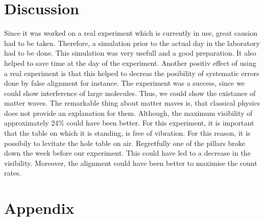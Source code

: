 \documentclass[12pt,a4paper]{article}
\begin{document}
\begin{multicols}{2}

\section{Discussion}
Since it was worked on a real experiment which is currently in use, great causion had to be taken. Therefore, a simulation prior to the actual day in the laboratory had to be done. This simulation was very usefull and a good preparation. It also helped to save time at the day of the experiment. Another positiv effect of using a real experiment is that this helped to decreas the posibility of systematic errors done by false alignment for instance.
The experiment was a success, since we could show interference of large molecules. Thus, we could show the existance of matter waves. The remarkable thing about matter maves is, that classical physics does not provide an explanation for them.  Although, the maximum visibility of approximately 24\% could have been better. 
For this experiment, it is important that the table on which it is standing, is free of vibration. For this reason, it is possibily to levitate the hole table on air. Regretfully one of the pillars broke down the week before our experiment. This could have led to a decrease in the visibility. Moreover, the alignment could have been better to maximise the count rates.

\section{Appendix}

\begin{figure}[H]
\centering
{}
\end{figure}
\end{multicols}
\end{document}
